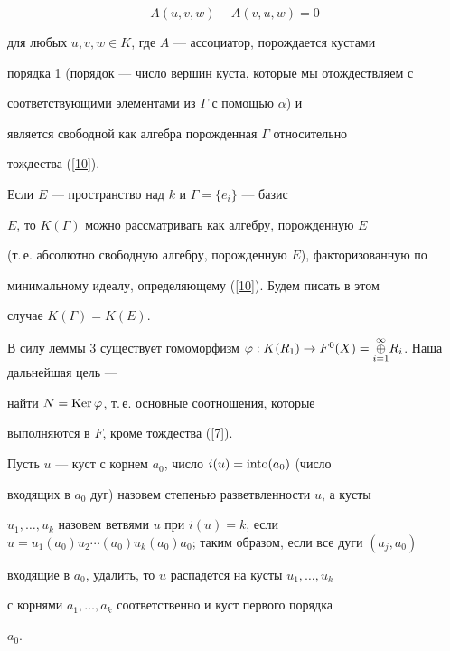 \begin{equation}\label{10}


A(u,v,w)-A(v,u,w)=0


\end{equation}


для любых $u,v,w \in K$, где $A$ --- ассоциатор, порождается кустами


порядка 1 (порядок --- число вершин куста, которые мы отождествляем с


соответствующими элементами из $\Gamma $ с помощью $\alpha $) и


является свободной как алгебра порожденная $\Gamma $ относительно


тождества (\ref{10}).





Если $E$ --- пространство над $k$ и $\Gamma =\{e_i\}$ --- базис


$E$, то $K(\Gamma )$ можно рассматривать как алгебру, порожденную $E$


(т.\,е. абсолютно свободную алгебру, порожденную $E$), факторизованную по


минимальному идеалу, определяющему (\ref{10}). Будем писать в этом


случае $K(\Gamma )=K(E)$.





В силу леммы 3 существует гомоморфизм $\varphi : K(R_1) 


\to F^0(X)=\treato{i=1}{\infty }R_i$. Наша дальнейшая цель ---


найти $N=\operatorname{Ker}\varphi $, т.\,е. основные соотношения, которые


выполняются в $F$, кроме тождества (\ref{7}).





Пусть $u$ --- куст с корнем $a_0$, число $i(u)=\operatorname{into} (a_0)$ (число


входящих в $a_0$ дуг) назовем степенью разветвленности $u$, а кусты


$u_1,\dotsc ,u_k$ назовем ветвями $u$ при $i(u)=k$, если $u=u_1(a_0)


u_2\dotsb (a_0)u_k(a_0)a_0$; таким образом, если все дуги $(a_j,a_0)$


входящие в $a_0$, удалить, то $u$ распадется на кусты $u_1,\dotsc ,u_k$


с корнями $a_1,\dotsc ,a_k$ соответственно и куст первого порядка


$a_0$.






